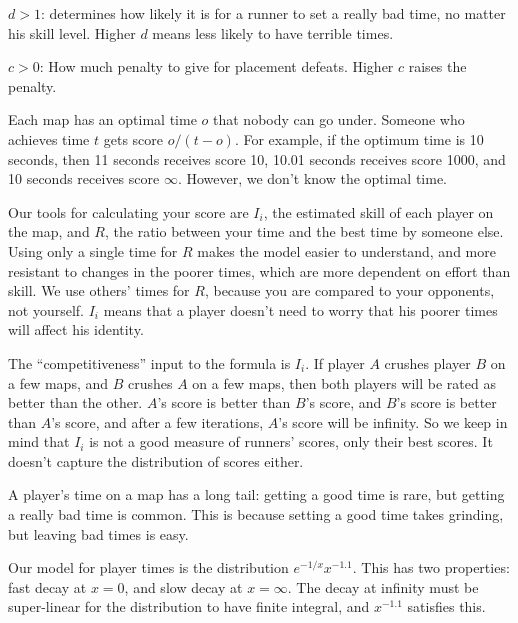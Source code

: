 $d > 1$: determines how likely it is for a runner to set a really bad time, no matter his skill level. Higher $d$ means less likely to have terrible times.

$c > 0$: How much penalty to give for placement defeats. Higher $c$ raises the penalty.


\pagebreak
Each map has an optimal time $o$ that nobody can go under. Someone who achieves time $t$ gets score $o / (t - o)$. For example, if the optimum time is 10 seconds, then 11 seconds receives score 10, 10.01 seconds receives score 1000, and 10 seconds receives score $\infty$. However, we don't know the optimal time.

Our tools for calculating your score are $I_i$, the estimated skill of each player on the map, and $R$, the ratio between your time and the best time by someone else. Using only a single time for $R$ makes the model easier to understand, and more resistant to changes in the poorer times, which are more dependent on effort than skill. We use others' times for $R$, because you are compared to your opponents, not yourself. $I_i$ means that a player doesn't need to worry that his poorer times will affect his identity.

The ``competitiveness'' input to the formula is $I_i$. If player $A$ crushes player $B$ on a few maps, and $B$ crushes $A$ on a few maps, then both players will be rated as better than the other. $A$'s score is better than $B$'s score, and $B$'s score is better than $A$'s score, and after a few iterations, $A$'s score will be infinity. So we keep in mind that $I_i$ is not a good measure of runners' scores, only their best scores. It doesn't capture the distribution of scores either.

A player's time on a map has a long tail: getting a good time is rare, but getting a really bad time is common. This is because setting a good time takes grinding, but leaving bad times is easy.

Our model for player times is the distribution $e^{-1/x}x^{-1.1}$. This has two properties: fast decay at $x = 0$, and slow decay at $x = \infty$. The decay at infinity must be super-linear for the distribution to have finite integral, and $x^{-1.1}$ satisfies this.


